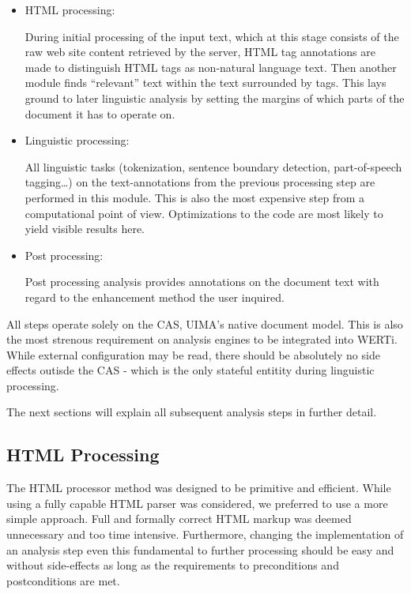 \documentclass[12pt]{article}
\begin{document}
\begin{itemize}

\item{ HTML processing: } 

  During initial processing of the input text, which at this stage consists of
  the raw web site content retrieved by the server,  HTML tag annotations are
  made to distinguish HTML tags as non-natural language text. Then another
  module finds ``relevant'' text within the text surrounded by tags. This lays
  ground to later linguistic analysis by setting the margins of which parts of
  the document it has to operate on.

\item{ Linguistic processing: } 
  
  All linguistic tasks (tokenization, sentence boundary detection,
  part-of-speech tagging\ldots{}) on the text-annotations from the previous
  processing step are performed in this module. This is also the most expensive
  step from a computational point of view. Optimizations to the code are most
  likely to yield visible results here.

\item{ Post processing: }
  
  Post processing analysis provides annotations on the document text with regard
  to the enhancement method the user inquired.  \end{itemize}

All steps operate solely on the CAS, UIMA's native document model. This is also
the most strenous requirement on analysis engines to be integrated into WERTi.
While external configuration may be read, there should be absolutely no side
effects outisde the CAS - which is the only stateful entitity during
linguistic processing.

The next sections will explain all subsequent analysis steps in further detail.

\subsection{HTML Processing}

The HTML processor method was designed to be primitive and efficient. While
using a fully capable HTML parser was considered, we preferred to use a more
simple approach. Full and formally correct HTML markup was deemed unnecessary and
too time intensive.
Furthermore, changing the
implementation of an analysis step even this fundamental to further processing
should be easy and without side-effects as long as the requirements to
preconditions and postconditions are met.
\end{document}
